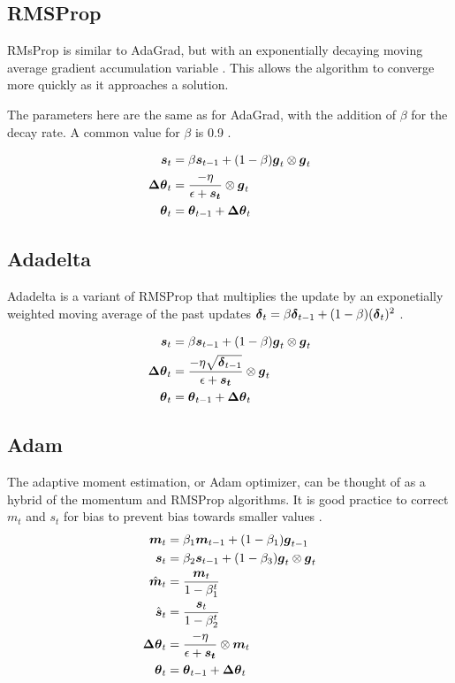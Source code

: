 \documentclass{article}
\begin{document}
\subsection{RMSProp} %

RMsProp is similar to AdaGrad, but with an exponentially decaying moving average gradient accumulation variable \cite{Goodfellow-et-al-2016}. This allows the algorithm to converge more quickly as it approaches a solution.

The parameters here are the same as for AdaGrad, with the addition of \(\beta\) for the decay rate. A common value for \(\beta\) is 0.9 \cite{pml1book}.

\begin{align*}
    \vb*{s}_t &= \beta \vb*{s}_{t-1} + (1-\beta)\vb*{g}_t \otimes \vb*{g}_t \\
    \vb*{\Delta \theta}_t &= \frac{-\eta}{\epsilon + \vb*{s_t}} \otimes \vb*{g}_t \\
    \vb*{\theta}_t &= \vb*{\theta}_{t-1} + \vb*{\Delta \theta}_t
\end{align*}

\subsection{Adadelta} %

Adadelta is a variant of RMSProp that multiplies the update by an exponetially weighted moving average of the past updates \(\vb*{\delta}_t = \beta \vb*{\delta}_{t-1} + (1-\beta)(\vb*{\delta}_t)^2\) \cite{pml1book} \cite{zeiler2012}.

\begin{align*}
    \vb*{s}_t &= \beta \vb*{s}_{t-1} + (1-\beta)\vb*{g}_t \otimes \vb*{g}_t \\
    \vb*{\Delta \theta}_t &= \frac{-\eta \sqrt{\vb*{\delta}_{t-1}}}{\epsilon + \vb*{s_t}} \otimes \vb*{g}_t \\
    \vb*{\theta}_t &= \vb*{\theta}_{t-1} + \vb*{\Delta \theta}_t
\end{align*}

\subsection{Adam} %

The adaptive moment estimation, or Adam optimizer, can be thought of as a hybrid of the momentum and RMSProp algorithms. It is good practice to correct \(m_t\) and \(s_t\) for bias to prevent bias towards smaller values \cite{pml1book}. %
\begin{align*}
    \vb*{m}_t &= \beta_1 \vb*{m}_{t-1} + (1-\beta_1)\vb*{g}_{t-1} \\
    \vb*{s}_t &= \beta_2 \vb*{s}_{t-1} + (1-\beta_3)\vb*{g}_t \otimes \vb*{g}_t \\
    \hat{\vb*{m}}_t &= \frac{\vb*{m}_t}{1-\beta^t_1} \\ 
    \hat{\vb*{s}}_t &= \frac{\vb*{s}_t}{1-\beta^t_2} \\ 
    \vb*{\Delta \theta}_t &= \frac{-\eta}{\epsilon + \vb*{s_t}} \otimes \vb*{m}_t \\
    \vb*{\theta}_t &= \vb*{\theta}_{t-1} + \vb*{\Delta \theta}_t
\end{align*}
\end{document}

